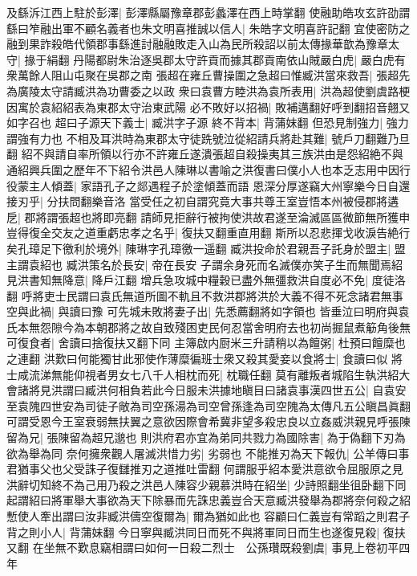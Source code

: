 及繇泝江西上駐於彭澤|{
	彭澤縣屬豫章郡彭蠡澤在西上時掌翻}
使融助皓攻玄許劭謂繇曰笮融出軍不顧名義者也朱文明喜推誠以信人|{
	朱皓字文明喜許記翻}
宜使密防之融到果詐殺皓代領郡事繇進討融融敗走入山為民所殺詔以前太傳掾華歆為豫章太守|{
	掾于絹翻}
丹陽都尉朱治逐吳郡太守許貢而據其郡貢南依山賊嚴白虎|{
	嚴白虎有衆萬餘人阻山屯聚在吳郡之南}
張超在雍丘曹操圍之急超曰惟臧洪當來救吾|{
	張超先為廣陵太守請臧洪為功曹委之以政}
衆曰袁曹方睦洪為袁所表用|{
	洪為超使劉虞路梗因寓於袁紹紹表為東郡太守治東武陽}
必不敗好以招禍|{
	敗補邁翻好呼到翻招音翹又如字召也}
超曰子源天下義士|{
	臧洪字子源}
終不背本|{
	背蒲妺翻}
但恐見制強力|{
	強力謂強有力也}
不相及耳洪時為東郡太守徒跣號泣從紹請兵將赴其難|{
	號戶刀翻難乃旦翻}
紹不與請自率所領以行亦不許雍丘遂潰張超自殺操夷其三族洪由是怨紹絶不與通紹興兵圍之歷年不下紹令洪邑人陳琳以書喻之洪復書曰僕小人也本乏志用中因行役蒙主人傾蓋|{
	家語孔子之郯遇程子於塗傾蓋而語}
恩深分厚遂竊大州寧樂今日自還接刃乎|{
	分扶問翻樂音洛}
當受任之初自謂究竟大事共尊王室豈悟本州被侵郡將遘戹|{
	郡將謂張超也將即亮翻}
請師見拒辭行被拘使洪故君遂至淪滅區區微節無所獲申豈得復全交友之道重虧忠孝之名乎|{
	復扶又翻重直用翻}
斯所以忍悲揮戈收淚告絶行矣孔璋足下徼利於境外|{
	陳琳字孔璋徼一遥翻}
臧洪投命於君親吾子託身於盟主|{
	盟主謂袁紹也}
臧洪策名於長安|{
	帝在長安}
子謂余身死而名滅僕亦笑子生而無聞焉紹見洪書知無降意|{
	降戶江翻}
增兵急攻城中糧穀已盡外無彊救洪自度必不免|{
	度徒洛翻}
呼將吏士民謂曰袁氏無道所圖不軌且不救洪郡將洪於大義不得不死念諸君無事空與此禍|{
	與讀曰豫}
可先城未敗將妻子出|{
	先悉薦翻將如字領也}
皆垂泣曰明府與袁氏本無怨隙今為本朝郡將之故自致殘困吏民何忍當舍明府去也初尚掘鼠煮䈥角後無可復食者|{
	舍讀曰捨復扶又翻下同}
主簿啟内厨米三升請稍以為饘粥|{
	杜預曰饘糜也之連翻}
洪歎曰何能獨甘此邪使作薄糜徧班士衆又殺其愛妾以食將士|{
	食讀曰似}
將士咸流涕無能仰視者男女七八千人相枕而死|{
	枕職任翻}
莫有離叛者城陷生執洪紹大會諸將見洪謂曰臧洪何相負若此今日服未洪據地瞋目曰諸袁事漢四世五公|{
	自袁安至袁隗四世安為司徒子敞為司空孫湯為司空曾孫逢為司空隗為太傳凡五公瞋昌眞翻}
可謂受恩今王室衰弱無扶翼之意欲因際會希冀非望多殺忠良以立姦威洪親見呼張陳留為兄|{
	張陳留為超兄邈也}
則洪府君亦宜為弟同共戮力為國除害|{
	為于偽翻下刃為欲為舉為同}
奈何擁衆觀人屠滅洪惜力劣|{
	劣弱也}
不能推刃為天下報仇|{
	公羊傳曰事君猶事父也父受誅子復讎推刃之道推吐雷翻}
何謂服乎紹本愛洪意欲令屈服原之見洪辭切知終不為己用乃殺之洪邑人陳容少親慕洪時在紹坐|{
	少詩照翻坐徂卧翻下同}
起謂紹曰將軍舉大事欲為天下除暴而先誅忠義豈合天意臧洪發舉為郡將奈何殺之紹慙使人牽出謂曰汝非臧洪儔空復爾為|{
	爾為猶如此也}
容顧曰仁義豈有常蹈之則君子背之則小人|{
	背蒲妹翻}
今日寧與臧洪同日而死不與將軍同日而生也遂復見殺|{
	復扶又翻}
在坐無不歎息竊相謂曰如何一日殺二烈士　公孫瓚既殺劉虞|{
	事見上卷初平四年}
